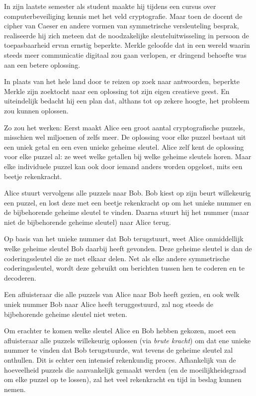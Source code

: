 \documentclass[
  a5paper,
  smalldemyvopaper,11pt,twoside,onecolumn,openright,extrafontsizes,
hidelinks]{memoir}
\begin{document}
In zijn laatste semester als student maakte hij tijdens een cursus over
computerbeveiliging kennis met het veld cryptografie. Maar toen de
docent de cipher van Caeser en andere vormen van symmetrische
versleuteling besprak, realiseerde hij zich meteen dat de noodzakelijke
sleuteluitwisseling in persoon de toepasbaarheid ervan ernstig beperkte.
Merkle geloofde dat in een wereld waarin steeds meer communicatie
digitaal zou gaan verlopen, er dringend behoefte was aan een betere
oplossing.

In plaats van het hele land door te reizen op zoek naar antwoorden,
beperkte Merkle zijn zoektocht naar een oplossing tot zijn eigen
creatieve geest. En uiteindelijk bedacht hij een plan dat, althans tot
op zekere hoogte, het probleem zou kunnen oplossen.

Zo zou het werken: Eerst maakt Alice een groot aantal cryptografische puzzels, misschien
wel miljoenen of zelfs meer. De oplossing voor elke puzzel bestaat uit
een uniek getal en een even unieke geheime sleutel. Alice zelf kent de
oplossing voor elke puzzel al: ze weet welke getallen bij welke geheime
sleutels horen. Maar elke individuele puzzel kan ook door iemand anders
worden opgelost, mits een beetje rekenkracht.

Alice stuurt vervolgens alle puzzels naar Bob. Bob kiest op zijn beurt
willekeurig een puzzel, en lost deze met een beetje rekenkracht op om
het unieke nummer en de bijbehorende geheime sleutel te vinden. Daarna
stuurt hij het nummer (maar niet de bijbehorende geheime sleutel) naar
Alice terug.

Op basis van het unieke nummer dat Bob terugstuurt, weet Alice
onmiddellijk welke geheime sleutel Bob daarbij heeft gevonden. Deze
geheime sleutel is dan de coderingssleutel die ze met elkaar delen. Net
als elke andere symmetrische coderingssleutel, wordt deze gebruikt om
berichten tussen hen te coderen en te decoderen.

Een afluisteraar die alle puzzels van Alice naar Bob heeft gezien, en
ook welk uniek nummer Bob naar Alice heeft teruggestuurd, zal nog steeds
de bijbehorende geheime sleutel niet weten.

Om erachter te komen welke sleutel Alice en Bob hebben gekozen, moet een
afluisteraar alle puzzels willekeurig oplossen (via \emph{brute kracht})
om dat ene unieke nummer te vinden dat Bob terugstuurde, wat tevens de
geheime sleutel zal onthullen. Dit is echter een intensief rekenkundig
proces. Afhankelijk van de hoeveelheid puzzels die aanvankelijk gemaakt
werden (en de moeilijkheidsgraad om elke puzzel op te lossen), zal het
veel rekenkracht en tijd in beslag kunnen nemen.
\end{document}
